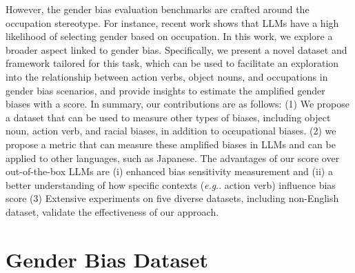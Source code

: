 \documentclass[11pt]{article}
\makeatletter
\newcommand{\R}[1]{{\color{black} {#1}}}
\def\eg{\emph{e.g}\onedot} \def\Eg{\emph{E.g}\onedot}
\DeclareRobustCommand\eg{%
  \UKUS@comma{e.g}%
}
\DeclareRobustCommand\onedot{\futurelet\@let@token\@onedot}
\def\@onedot{\ifx\@let@token.\else.\null\fi\xspace}
\DeclareRobustCommand\onedot{\futurelet\@let@token\@onedot}
\def\@onedot{\ifx\@let@token.\else.\null\fi\xspace}
\DeclareRobustCommand\onedot{\futurelet\@let@token\@onedot}
\def\@onedot{\ifx\@let@token.\else.\null\fi\xspace}
\def\eg{\emph{e.g}\onedot} \def\Eg{\emph{E.g}\onedot}
\makeatother
\begin{document}
However, the gender bias evaluation benchmarks \cite{zhao2018gender, rudinger-EtAl:2018:N18, NEURIPS2020_92650b2e,levy2021collecting, gender-bias-llm} are crafted around the occupation stereotype. For instance, recent work \cite{gender-bias-llm} shows that LLMs have a high likelihood of selecting gender based on occupation. In this work, we explore a broader aspect linked to gender bias. Specifically, we present a novel dataset and framework tailored for this task, which can be used to facilitate an exploration into the relationship between action verbs, object nouns, and occupations in gender bias scenarios, and provide insights to estimate the amplified gender biases with a score.  \R{In summary, our contributions are as follows: (1) We propose a dataset that can be used to measure other types of biases, including object noun, action verb, and racial biases, in addition to occupational biases. (2) we propose a metric that can measure these amplified biases in  LLMs and can be applied to other languages, such as Japanese. The advantages of our score over out-of-the-box LLMs are (i) enhanced bias sensitivity measurement and (ii) a better understanding of how specific contexts (\eg action verb) influence bias score (3) Extensive experiments on five diverse datasets, including non-English dataset, validate the effectiveness of our approach.}

\section{Gender Bias Dataset}
\end{document}
